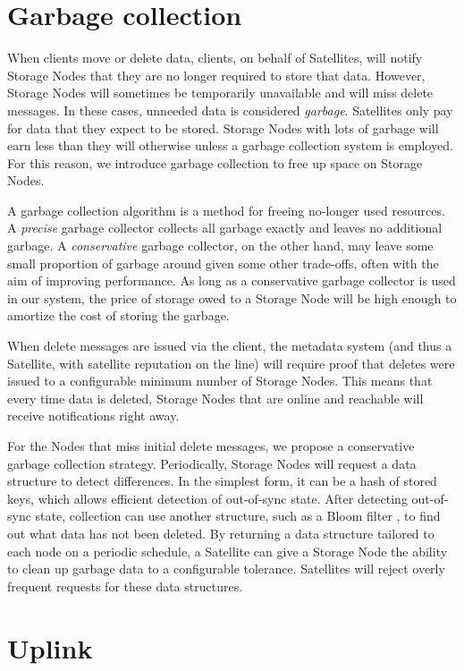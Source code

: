 \documentclass[8pt,fleqn,openany]{book}
\begin{document}
\section{Garbage collection}\label{sec:garbage-collection}

When clients move or delete data, clients, on behalf of Satellites, will notify
Storage Nodes
that they are no longer required to store that data. However,
Storage Nodes will sometimes be temporarily unavailable and will miss delete
messages. In these cases, unneeded data is considered
{\em garbage}. Satellites only pay for data that they expect to be stored. Storage
Nodes with lots of garbage will earn less than they will
otherwise unless a garbage collection system is employed. For this reason, we
introduce garbage collection to free up space on Storage Nodes.

A garbage collection algorithm is a method for freeing no-longer used resources.
A {\em precise} garbage collector collects all garbage exactly and
leaves no additional garbage. A {\em conservative} garbage collector, on the
other hand, may
leave some small proportion of garbage around given some other trade-offs,
often with the aim of improving performance.
As long as a conservative garbage collector is used in our system, the price of
storage owed to a Storage Node will be high enough to amortize the cost of
storing the garbage.

When delete messages are issued via the client, the metadata system (and thus a
Satellite, with satellite reputation on the line) will require proof that
deletes were issued to a configurable minimum number of Storage Nodes.
This means that every time
data is deleted, Storage Nodes that are online and reachable will receive
notifications right away.

For the Nodes that miss initial delete messages, we propose a conservative
garbage collection strategy. Periodically, Storage Nodes will request
a data structure to detect differences. In the simplest form, it can be a hash
of stored keys, which allows efficient detection of out-of-sync state. After
detecting out-of-sync state, collection can use another structure, such as a
Bloom filter \cite{bloom-filter}, to find out what data has not been
deleted.
By returning a data
structure tailored to each node on a periodic schedule, a Satellite can give a
Storage Node the ability to clean up garbage data to a configurable tolerance.
Satellites will reject overly frequent requests for these data structures.

\section{Uplink}
\end{document}
